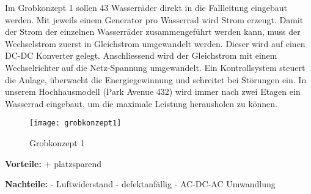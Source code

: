 Im Grobkonzept 1 sollen 43 Wasserräder direkt in die Fallleitung eingebaut werden. Mit jeweils einem Generator pro Wasserrad wird Strom erzeugt. Damit der Strom der einzelnen Wasserräder zusammengeführt werden kann, muss der Wechselstrom zuerst in Gleichstrom umgewandelt werden. Dieser wird auf einen DC-DC Konverter gelegt. Anschliessend wird der Gleichstrom mit einem Wechselrichter auf die Netz-Spannung umgewandelt. Ein Kontrollsystem steuert die Anlage, überwacht die Energiegewinnung und schreitet bei Störungen ein. In unserem Hochhausmodell (Park Avenue 432) wird immer nach zwei Etagen ein Wasserrad eingebaut, um die maximale Leistung herausholen zu können. 
\newpage
\begin{wrapfigure}{r}{0.5\textwidth}
  \begin{center}
    \texttt{[image: grobkonzept1]}
  \end{center}
  \caption{Grobkonzept 1}
\end{wrapfigure}
\bigskip

\textbf{Vorteile:}								\newline
+	platzsparend									\newline
	
\textbf{Nachteile:}								\newline
-	Luftwiderstand								\newline
- 	defektanfällig								\newline
-	AC-DC-AC Umwandlung							\newline
\WFclear
\newpage

